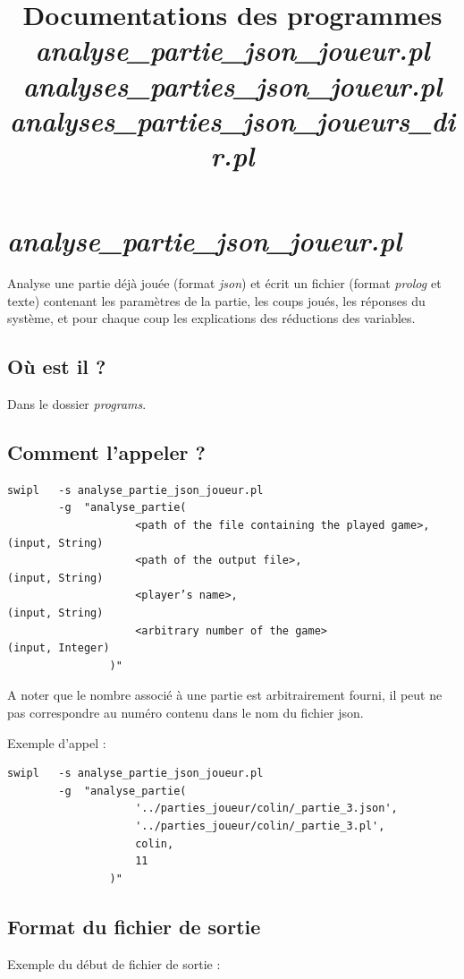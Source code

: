 \documentclass[a4paper,12pt]{article}
\begin{document}
\title{Documentations des programmes \\
		\emph{analyse\_partie\_json\_joueur.pl} \\
		 \emph{analyses\_parties\_json\_joueur.pl} \\
		  \emph{analyses\_parties\_json\_joueurs\_dir.pl}}
\date{}
\maketitle

\section{\emph{analyse\_partie\_json\_joueur.pl}}

Analyse une partie déjà jouée (format \emph{json}) et écrit un fichier (format \emph{prolog} et texte) contenant les paramètres de la partie, les coups joués,  les réponses du système, et pour chaque coup les explications des réductions des variables.

\subsection*{Où est il ?}
	Dans le dossier \emph{programs}.
	
\subsection*{Comment l’appeler ?}
	
\begin{Verbatim}
swipl	-s analyse_partie_json_joueur.pl
		-g  "analyse_partie(
					<path of the file containing the played game>, 	(input, String)
					<path of the output file>, 							(input, String)
					<player’s name>,											(input, String)
					<arbitrary number of the game>						(input, Integer)
				)"
\end{Verbatim}

A noter que le nombre associé à une partie est arbitrairement fourni, il peut ne pas correspondre au numéro contenu
dans le nom du fichier json.

Exemple d’appel :
\begin{Verbatim}
swipl	-s analyse_partie_json_joueur.pl 
		-g  "analyse_partie(
					'../parties_joueur/colin/_partie_3.json', 
					'../parties_joueur/colin/_partie_3.pl',
					colin,
					11
				)"
\end{Verbatim}

\subsection*{Format du fichier de sortie}
Exemple du début de fichier de sortie :
\end{document}

